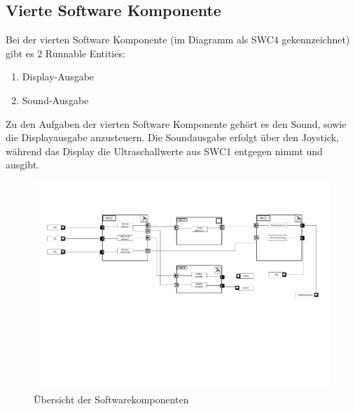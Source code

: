 \subsection{Vierte Software Komponente}
Bei der vierten Software Komponente (im Diagramm als SWC4 gekennzeichnet) gibt es 2 Runnable Entities:
\begin{enumerate}
\item Display-Ausgabe
\item Sound-Ausgabe
\end{enumerate}
Zu den Aufgaben der vierten Software Komponente gehört es den Sound, sowie die Displayausgabe anzusteuern. Die Soundausgabe erfolgt über den Joystick, während das Display die Ultraschallwerte aus SWC1 entgegen nimmt und ausgibt.
\clearpage
\newpage
\begin{landscape}
\begin{figure}[h]
\includegraphics[scale=0.35,page=1]{Dokumente/ComponentDiagram.pdf}
\caption{Übersicht der Softwarekomponenten}
\label{pic:Softwarekompo}
\end{figure}
\end{landscape}
\newpage